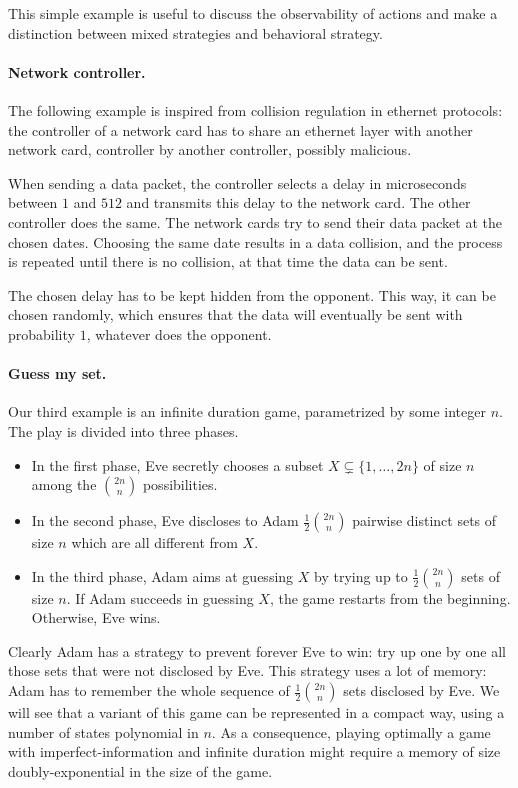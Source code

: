 This simple example is useful to discuss the observability of actions
and make a distinction between
mixed strategies and behavioral strategy.
 
\paragraph{Network controller.}
The following example is inspired from collision regulation
in ethernet protocols: the controller of a network card
has to share an ethernet layer with
another network card, controller by another controller,
possibly malicious.

When sending a data packet,
the controller selects a delay in microseconds between $1$ and $512$
and transmits this delay to the network card.
The other controller does the same.
The network cards try to send their data packet at the chosen dates.
Choosing the same date results in a data collision, and the process is repeated until
there is no collision, at that time the data can be sent.

The chosen delay has to be kept hidden from the opponent.
This way, it can be chosen randomly,
which ensures that the data will eventually be sent with probability $1$,
whatever does the opponent.
  
\paragraph{Guess my set.}
Our third example is an infinite duration game,
parametrized by some integer $n$.
The play is
divided into three phases.
\begin{itemize}
\item In the first phase, Eve secretly chooses a subset
$X \subsetneq \{1, \ldots,2n\}$ of size $n$
among the $\binom{2n}{n}$ possibilities.
\item In the second phase, Eve discloses to Adam
$\frac{1}{2}\binom{2n}{n}$ pairwise distinct sets of size
$n$ which are all different from $X$. 
\item In the third phase, Adam aims at guessing $X$ by trying up to
$\frac{1}{2} \binom{2n}{n}$ sets of size $n$. 
If Adam succeeds in guessing $X$,
the game restarts from the beginning. Otherwise, 
Eve wins.
\end{itemize}

Clearly Adam has a strategy to prevent forever
Eve to win: try up one by one all those sets
that were not disclosed by Eve.
This strategy uses a lot of memory:
Adam has to remember the whole sequence of $\frac{1}{2} \binom{2n}{n}$
 sets disclosed by Eve.
We will see that a variant of this game can be represented 
in a compact way, using a number of states polynomial in $n$.
As a consequence, playing optimally a game with imperfect-information and infinite duration
might require a memory of size doubly-exponential in the size of the game.

